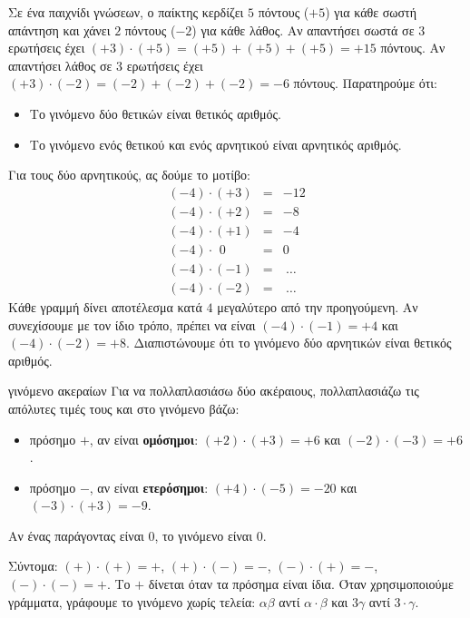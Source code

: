 

Σε ένα παιχνίδι γνώσεων, ο παίκτης κερδίζει $5$ πόντους ($+5$) για κάθε σωστή απάντηση και χάνει $2$ πόντους ($-2$) για κάθε λάθος. Αν απαντήσει σωστά σε $3$ ερωτήσεις έχει $(+3)\cdot(+5)=(+5)+(+5)+(+5)=+15$ πόντους. Αν απαντήσει λάθος σε $3$ ερωτήσεις έχει $(+3)\cdot(-2)=(-2)+(-2)+(-2)=-6$ πόντους. Παρατηρούμε ότι:

\begin{itemize}[leftmargin=1.2em,itemsep=0.3ex,topsep=2pt]
\item Το γινόμενο δύο θετικών είναι θετικός αριθμός.
\item Το γινόμενο ενός θετικού και ενός αρνητικού είναι αρνητικός αριθμός.
\end{itemize}

Για τους δύο αρνητικούς, ας δούμε το μοτίβο:
$$\begin{array}{rcl}
(-4)\cdot(+3)&=&-12\\
(-4)\cdot(+2)&=&-8\\
(-4)\cdot(+1)&=&-4\\
(-4)\cdot\phantom{(}0&=&0\\
(-4)\cdot(-1)&=&\ \ldots\\
(-4)\cdot(-2)&=&\ \ldots
\end{array}$$
Κάθε γραμμή δίνει αποτέλεσμα κατά $4$ μεγαλύτερο από την προηγούμενη. Αν συνεχίσουμε με τον ίδιο τρόπο, πρέπει να είναι $(-4)\cdot(-1)=+4$ και $(-4)\cdot(-2)=+8$. Διαπιστώνουμε ότι το γινόμενο δύο αρνητικών είναι θετικός αριθμός.

\begin{kanonas}{γινόμενο ακεραίων}
Για να πολλαπλασιάσω δύο ακέραιους, πολλαπλασιάζω τις απόλυτες τιμές τους και στο γινόμενο βάζω:
\begin{itemize}[leftmargin=1.2em,itemsep=0.3ex,topsep=2pt]
\item πρόσημο $+$, αν είναι \textbf{ομόσημοι}: $(+2)\cdot(+3)=+6$ και $(-2)\cdot(-3)=+6$.
\item πρόσημο $-$, αν είναι \textbf{ετερόσημοι}: $(+4)\cdot(-5)=-20$ και $(-3)\cdot(+3)=-9$.
\end{itemize}
Αν ένας παράγοντας είναι $0$, το γινόμενο είναι $0$.
\end{kanonas}

Σύντομα: $(+)\cdot(+)=+$, $(+)\cdot(-)=-$, $(-)\cdot(+)=-$, $(-)\cdot(-)=+$. Το $+$ δίνεται όταν τα πρόσημα είναι ίδια. Όταν χρησιμοποιούμε γράμματα, γράφουμε το γινόμενο χωρίς τελεία: $\alpha\beta$ αντί $\alpha\cdot\beta$ και $3\gamma$ αντί $3\cdot\gamma$.

